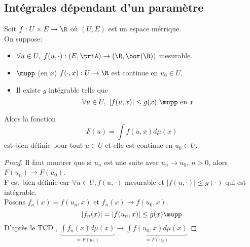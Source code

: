 \subsection{Intégrales dépendant d'un paramètre}

\begin{theorem}
	Soit $f : U \times E \to \R$ où $(U,E)$ est un espace métrique.\\
	On suppose:
	\begin{itemize}
		\item $\forall u \in U,\ f (u, \cdot) : (E, \triA) \to (\R, \bor(\R))$ mesurable.
		\item $\mupp$ (en $x$) $f(\cdot, x) : U  \to \R$ est continue en $u_0 \in U$.
		\item Il existe $g$ intégrable telle que
		      $$\forall u \in U, \ \left| f(u,x) \right| \leq g(x) \ \mupp \text{ en } x$$
	\end{itemize}
	Alors la fonction
	$$F (u) = \int f(u,x) d\mu(x)$$
	est bien définie pour tout $u \in U$ et elle est continue en $u_0 \in U$.
\end{theorem}


\begin{proof}
	Il faut montrer que si $u_n$ est une suite avec $u_n \to u_0, \ n > 0$, alors $F(u_n) \to F(u_0)$.\\
	F est bien définie car $\forall u \in U, f(u,\cdot)$ mesurable et $|f(u,\cdot)| \leq g(\cdot)$ qui est intégrable.\\

	Posons $f_n(x) = f(u_n,x)$ et $f_n(x) \to f(u_0,x)$.\\
	$$|f_n(x)|= |f(u_n, x)| \leq g(x) \mupp$$
	D'après le TCD , $\underbrace{\int f_n(x)d\mu(x)}_{=F(u_n)} \to  \underbrace{\int f(u_0, x)d\mu(x)}_{= F(u_0)}$
\end{proof}

